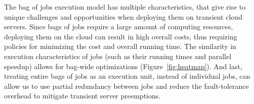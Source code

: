The bag of jobs execution model has multiple characteristics, that give rise to unique challenges and opportunities when deploying them on transient cloud servers. 
Since bags of jobs require a large amount of computing resources, deploying them on the cloud can result in high overall costs, thus requiring policies for minimizing the cost and overall running time. 
The similarity in execution characteristics of jobs (such as their running times and parallel speedup) allows for bag-wide optimizations (Figure~\ref{fig:heatmap}). 
And last, treating entire bags of jobs as an execution unit, instead of individual jobs, can allow us to use partial redundancy between jobs and reduce the fault-tolerance overhead to mitigate transient server preemptions. 



